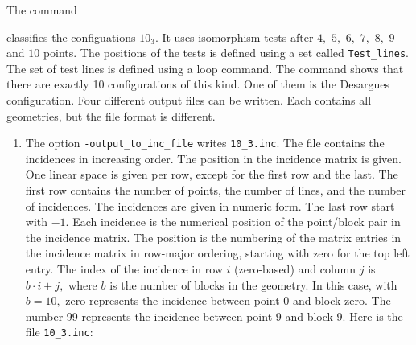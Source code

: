 The command 
{\tt

}
classifies the configuations $10_3$. 
It uses isomorphism tests after $4,$ $5,$ $6,$ $7,$ $8,$ $9$ and $10$ points.
The positions of the tests is defined using a set called \verb'Test_lines'. 
The set of test lines is defined using a loop command.
The command shows that 
there are exactly 10 configurations of this kind. 
One of them is the Desargues configuration. 
Four different output files can be written.
Each contains all geometries, but the file format is different.
\begin{enumerate}
\item
The option \verb'-output_to_inc_file'
writes \verb'10_3.inc'. 
The file contains the incidences in increasing order. 
The position in the incidence matrix is given.
One linear space is given per row, except for the first row and the last. 
The first row contains the number of points, the number of lines, and the number of incidences.
The incidences are given in numeric form. 
The last row start with $-1.$
Each incidence is the numerical position of the point/block pair in the 
incidence matrix. 
The position is the numbering of the matrix entries 
in the incidence matrix in row-major ordering, 
starting with zero for the top left entry. 
The index of the incidence in row $i$ (zero-based) and column $j$  is $b\cdot i + j,$ 
where $b$ is the number of blocks in the geometry.
In this case, with $b=10,$ zero represents the incidence between point 0 and block zero. 
The number 99 represents the incidence between point 9 and block 9.
Here is the file \verb'10_3.inc':


\end{enumerate}
